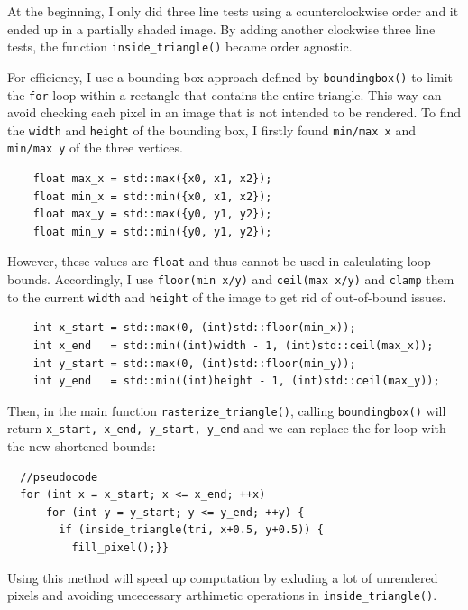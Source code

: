 \documentclass[11pt]{article}
\begin{document}
At the beginning, I only did three line tests using a counterclockwise
order and it ended up in a partially shaded image. By adding another clockwise three line
tests, the function \texttt{inside\_triangle()} became order agnostic.

For efficiency, I use a bounding box approach defined by \texttt{boundingbox()} to limit the
\texttt{for} loop within a rectangle that contains the entire triangle.
This way can avoid checking each pixel in an image that is not intended to be rendered.
To find the \texttt{width} and \texttt{height} of the bounding box, I firstly
found \texttt{min/max x} and \texttt{min/max y} of the three vertices.

\begin{verbatim}
    float max_x = std::max({x0, x1, x2});
    float min_x = std::min({x0, x1, x2});
    float max_y = std::max({y0, y1, y2});
    float min_y = std::min({y0, y1, y2});
\end{verbatim}

However, these values are \texttt{float} and thus cannot be used in calculating loop bounds.
Accordingly, I use \texttt{floor(min x/y)} and \texttt{ceil(max x/y)} and \texttt{clamp}
them to the current \texttt{width} and \texttt{height} of the image to get rid of
out-of-bound issues.

\begin{verbatim}
    int x_start = std::max(0, (int)std::floor(min_x));
    int x_end   = std::min((int)width - 1, (int)std::ceil(max_x));
    int y_start = std::max(0, (int)std::floor(min_y));
    int y_end   = std::min((int)height - 1, (int)std::ceil(max_y));
\end{verbatim}

Then, in the main function \texttt{rasterize\_triangle()}, calling 
\texttt{boundingbox()} will return \texttt{x\_start, x\_end, y\_start, y\_end} and
we can replace the for loop with the new shortened bounds:
\begin{verbatim}
  //pseudocode
  for (int x = x_start; x <= x_end; ++x)
      for (int y = y_start; y <= y_end; ++y) {
        if (inside_triangle(tri, x+0.5, y+0.5)) {
          fill_pixel();}}
\end{verbatim}

Using this method will speed up computation by exluding a lot of unrendered pixels and
avoiding uncecessary arthimetic operations in \texttt{inside\_triangle()}.
\end{document}
